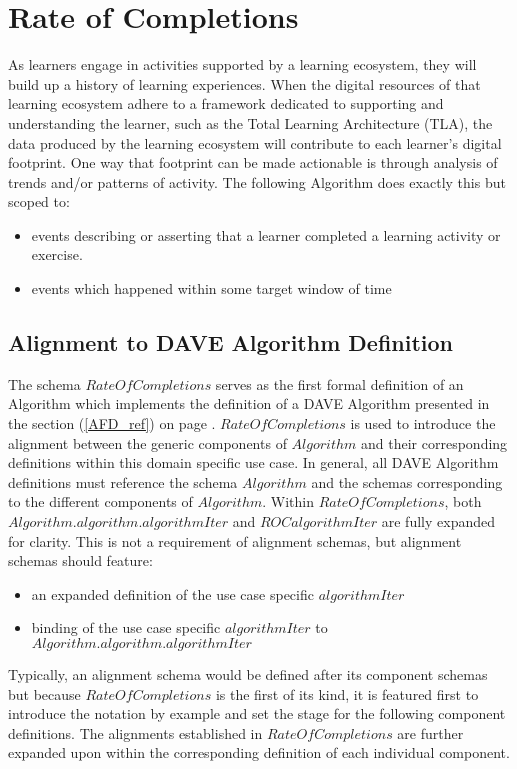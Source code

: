 \documentclass[../main.tex]{subfiles}
\begin{document}
\section{Rate of Completions}
As learners engage in activities supported by a learning ecosystem, they will build
up a history of learning experiences. When the digital resources of that learning ecosystem
adhere to a framework dedicated to supporting and understanding the
learner, such as the Total Learning Architecture (TLA), the data produced by the learning ecosystem
will contribute to each learner's digital footprint. One way that footprint can be made actionable is
through analysis of trends and/or patterns of activity. The following
Algorithm does exactly this but scoped to:
\begin{itemize}
\item events describing or asserting that a learner completed a learning activity or exercise.
\item events which happened within some target window of time
\end{itemize}
\subsection{Alignment to DAVE Algorithm Definition}
The schema $RateOfCompletions$ serves as the first formal definition of an Algorithm which implements
the definition of a DAVE Algorithm presented in the section (\ref{AFD_ref}) on page \pageref{AFD_ref}.
$RateOfCompletions$ is used to introduce the alignment between the generic components of $Algorithm$ and their
corresponding definitions within this domain specific use case. In general, all DAVE Algorithm definitions must reference the
schema $Algorithm$ and the schemas corresponding to the different components of $Algorithm$. Within $RateOfCompletions$,
both $Algorithm.algorithm.algorithmIter$ and $ROCalgorithmIter$ are fully expanded for clarity. This is not a requirement
of alignment schemas, but alignment schemas should feature:
\begin{itemize}
\item an expanded definition of the use case specific $algorithmIter$
\item binding of the use case specific $algorithmIter$ to $Algorithm.algorithm.algorithmIter$
\end{itemize}
Typically, an alignment schema would be defined after its component schemas but because $RateOfCompletions$
is the first of its kind, it is featured first to introduce the notation by example and set the stage
for the following component definitions. The alignments established in $RateOfCompletions$ are further
expanded upon within the corresponding definition of each individual component.
\end{document}
